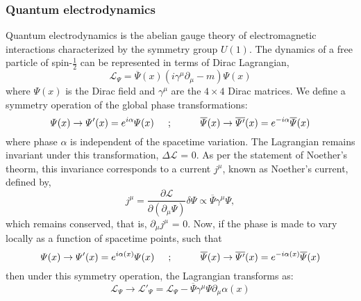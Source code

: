 \subsubsection{Quantum electrodynamics}
Quantum electrodynamics is the abelian gauge theory of electromagnetic interactions characterized by the symmetry group $U (1)$.
The dynamics of a free particle of spin-$\frac{1}{2}$ can be represented in terms of Dirac Lagrangian,
\begin{equation}
\mathcal{L}_{\Psi} = \overline{\Psi}(x)(i\gamma^{\mu}\partial_{\mu} - m){\Psi}(x)
\label{eq:QEDLang}
\end{equation}
where $\Psi(x)$ is the Dirac field and $\gamma^{\mu}$ are the $4\times4$ Dirac matrices. We define a symmetry operation of the global phase transformations:
\begin{equation}
\Psi(x) \rightarrow \Psi^{\prime}(x) = e^{i{\alpha}}\Psi(x) \hspace{0.2 in}; \hspace{0.4 in} \overline{\Psi}(x) \rightarrow \overline{\Psi^{\prime}}(x) = e^{-i{\alpha}}\overline{\Psi}(x)
\label{eg:Globalphase}
\end{equation}
where phase $\alpha$ is independent of the spacetime variation. The Lagrangian remains invariant under this transformation, $\Delta\mathcal{L}$ = 0.
As per the statement of Noether's theorm, this invariance corresponds to a current $j^{\mu}$, known as Noether's current, defined by,
\begin{equation}
j^{\mu} = \frac{\partial\mathcal{L}}{\partial(\partial_{\mu}\Psi)}\delta\Psi \propto \overline{\Psi}\gamma^{\mu}{\Psi},
\label{eg:jmu}
\end{equation}
which remains conserved, that is, $\partial_{\mu}j^{\mu}$ = $0$. Now, if the phase is made to vary locally as a function of spacetime points, such that
\begin{equation}
\Psi(x) \rightarrow \Psi^{\prime}(x) = e^{i{\alpha}(x)}\Psi(x) \hspace{0.2 in}; \hspace{0.4 in} \overline{\Psi}(x) \rightarrow \overline{\Psi^{\prime}}(x) = e^{-i{\alpha}(x)}\overline{\Psi}(x)
\label{eg:Localphase}
\end{equation}
then under this symmetry operation, the Lagrangian transforms as:
\begin{equation}
\mathcal{L}_{\Psi} \rightarrow \mathcal{L}'_{\Psi} = \mathcal{L}_{\Psi} - \overline{\Psi}{\gamma}^{\mu}{\Psi}{\partial}_{\mu}{\alpha}(x) 
\label{eg:LangInLocalPhase}
\end{equation}
